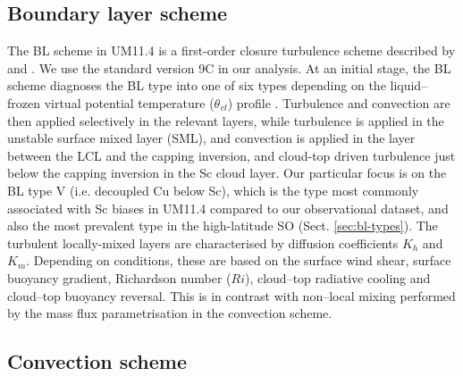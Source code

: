 \subsection{Boundary layer scheme}
\label{sec:bl-scheme}

The BL scheme in UM11.4 is a first-order closure turbulence
scheme described by \cite{lock2000} and \cite{martin2000}. We use the standard
version 9C in our analysis.
At an initial stage, the BL scheme diagnoses the BL type
into one of six types depending on the liquid--frozen virtual potential
temperature ($\theta_{vl}$) profile \cite[Fig. 1]{lock2000}. Turbulence and convection
are then applied selectively in the relevant layers, while turbulence is applied in the unstable surface mixed layer (SML), and convection is applied in the layer between
the LCL and the capping inversion, and cloud-top driven turbulence just below
the capping inversion in the Sc cloud layer. Our particular focus is on
the BL type V (i.e. decoupled Cu below Sc), which is the type most commonly
associated with Sc biases in UM11.4 compared to our observational dataset,
and also the most prevalent type in the high-latitude SO (Sect. \ref{sec:bl-types}).
The turbulent locally-mixed layers are characterised by diffusion coefficients
$K_h$ and $K_m$. Depending on conditions, these are based on the surface wind
shear, surface buoyancy gradient, Richardson number ($Ri$),
cloud--top radiative cooling and cloud--top buoyancy reversal. This is in contrast
with non--local mixing performed by the mass flux parametrisation in the
convection scheme.

\subsection{Convection scheme}
\label{sec:convection-scheme}


